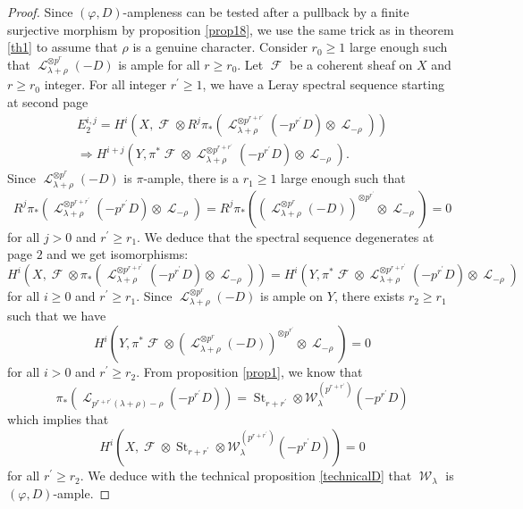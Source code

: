 \documentclass[11pt]{amsart}
\numberwithin{subsection}{section}
\numberwithin{figure}{section}
\numberwithin{table}{section}
\theoremstyle{1}
\theoremstyle{2}
\DeclareMathOperator{\St}{St}
\DeclareMathOperator{\Lc}{\mathcal{L}}
\DeclareMathOperator{\Fc}{\mathcal{F}}
\DeclareMathOperator{\W}{\mathcal{W}}
\begin{document}
\begin{proof}
Since $(\varphi,D)$-ampleness can be tested after a pullback by a finite surjective morphism by proposition \ref{prop18}, we use the same trick as in theorem \ref{th1} to assume that $\rho$ is a genuine character. Consider $r_0\geq 1$ large enough such that $\Lc_{\lambda+\rho}^{\otimes p^{r}}(-D)$ is ample for all $r\geq r_0$. Let $\Fc$ be a coherent sheaf on $X$ and $r \geq r_0$ integer. For all integer $r^\prime \geq 1$, we have a Leray spectral sequence starting at second page
\begin{multline*}
E_2^{i,j} = H^i(X,\Fc \otimes R^j\pi_*(\Lc_{\lambda+\rho}^{\otimes p^{r+r^\prime}}(-p^{r^\prime}D) \otimes \Lc_{-\rho}))\\ \Rightarrow H^{i+j}(Y,\pi^*\Fc \otimes \Lc_{\lambda+\rho}^{\otimes p^{r+r^\prime}}(-p^{r^\prime}D) \otimes \Lc_{-\rho}).
\end{multline*}
Since $\Lc_{\lambda+\rho}^{\otimes p^{r}}(-D)$ is $\pi$-ample, there is a $r_1 \geq 1$ large enough such that
\begin{equation*}
R^j\pi_*(\Lc_{\lambda+\rho}^{\otimes p^{r+r^\prime}}(-p^{r^\prime}D) \otimes \Lc_{-\rho}) = R^j\pi_*((\Lc_{\lambda+\rho}^{\otimes p^{r}}(-D))^{\otimes p^{r^\prime}} \otimes \Lc_{-\rho}) = 0
\end{equation*}
for all $j>0$ and $r^\prime \geq r_1$. We deduce that the spectral sequence degenerates at page $2$ and we get isomorphisms:
\begin{equation*}
H^i(X,\Fc \otimes \pi_*(\Lc_{\lambda+\rho}^{\otimes p^{r+r^\prime}}(-p^{r^\prime}D) \otimes \Lc_{-\rho})) = H^{i}(Y,\pi^*\Fc \otimes \Lc_{\lambda+\rho}^{\otimes p^{r+r^\prime}}(-p^{r^\prime}D) \otimes \Lc_{-\rho})
\end{equation*}
for all $i\geq 0$ and $r^\prime \geq r_1$. Since $\Lc_{\lambda+\rho}^{\otimes p^{r}}(-D)$ is ample on $Y$, there exists $r_2 \geq r_1$ such that we have 
\begin{equation*}
H^{i}(Y,\pi^*\Fc \otimes (\Lc_{\lambda+\rho}^{\otimes p^{r}}(-D))^{\otimes p^{r^\prime}}\otimes \Lc_{-\rho}) = 0
\end{equation*} 
for all $i>0$ and $r^\prime \geq r_2$. From proposition \ref{prop1}, we know that 
\begin{equation*}
\pi_*(\Lc_{p^{r+r^\prime}(\lambda+\rho)-\rho}(-p^{r^\prime}D)) = \St_{r+r^\prime} \otimes \mathcal{W}_{\lambda}^{(p^{r+r^\prime})}(-p^{r^\prime}D)
\end{equation*}
which implies that 
\begin{equation*}
H^i(X,\Fc \otimes \St_{r+r^\prime} \otimes \mathcal{W}_{\lambda}^{(p^{r+r^\prime})}(-p^{r^\prime}D)) = 0
\end{equation*}
for all $r^\prime \geq r_2$. We deduce with the technical proposition \ref{technicalD} that $\W_{\lambda}$ is $(\varphi,D)$-ample.
\end{proof}
\end{document}
